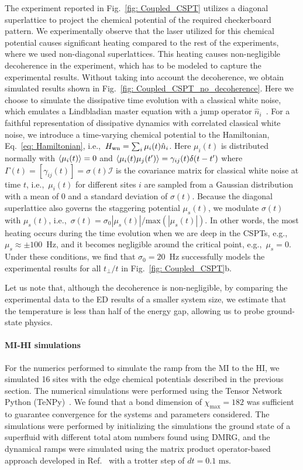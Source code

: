 \documentclass[preprint,superscriptaddress,floatfix, nofootinbib]{revtex4-2}
\begin{document}
The experiment reported in Fig.~\ref{fig: Coupled_CSPT} utilizes a diagonal superlattice to project the chemical potential of the required checkerboard pattern. We experimentally observe that the laser utilized for this chemical potential causes significant heating compared to the rest of the experiments, where we used non-diagonal superlattices. This heating causes non-negligible decoherence in the experiment, which has to be modeled to capture the experimental results. Without taking into account the decoherence, we obtain simulated results shown in Fig.~\ref{fig: Coupled_CSPT_no_decoherence}. Here we choose to simulate the dissipative time evolution with a classical white noise, which emulates a Lindbladian master equation with a jump operator $\hat n_i$~\cite{Kampen1992, Seif2022}. For a faithful representation of dissipative dynamics with correlated classical white noise, we introduce a time-varying chemical potential to the Hamiltonian, Eq.~\eqref{eq: Hamiltonian}, i.e.,~$H_{\rm wn}=\sum_i \mu_i(t) \hat  n_i$. Here $\mu_i(t)$ is distributed normally with $\braket{\mu_i(t)}=0$ and $\braket{\mu_i(t)\mu_j(t')}=\gamma_{ij}(t) \delta(t-t')$ where $\Gamma(t)=\left[\gamma_{ij}(t)\right]=\sigma(t)\mathcal{I}$ is the covariance matrix for classical white noise at time $t$, i.e.,~$\mu_i(t)$ for different sites $i$ are sampled from a Gaussian distribution with a mean of $0$ and a standard deviation of $\sigma(t)$. Because the diagonal superlattice also governs the staggering potential $\mu_s(t)$, we modulate $\sigma(t)$ with $\mu_s(t)$, i.e.,~$\sigma(t)=\sigma_0 |\mu_s(t)|/\textrm{max}(|\mu_s(t)|)$. In other words, the most heating occurs during the time evolution when we are deep in the CSPTs, e.g.,~$\mu_s \approx \pm 100$~Hz, and it becomes negligible around the critical point, e.g.,~$\mu_s=0$. Under these conditions, we find that $\sigma_0=20$~Hz successfully models the experimental results for all $t_\perp/t$ in Fig.~\ref{fig: Coupled_CSPT}b.

Let us note that, although the decoherence is non-negligible, by comparing the experimental data to the ED results of a smaller system size, we estimate that the temperature is less than half of the energy gap, allowing us to probe ground-state physics.

\paragraph*{MI-HI simulations} For the numerics performed to simulate the ramp from the MI to the HI, we simulated 16 sites with the edge chemical potentials described in the previous section.
%
The numerical simulations were performed using the Tensor Network Python (TeNPy)~\cite{Hauschild18}. 
%
We found that a bond dimension of $\chi_{\text{max}} = 182$ was sufficient to guarantee convergence for the systems and parameters considered.
%
The simulations were performed by initializing the simulations the ground state of a superfluid with different total atom numbers found using DMRG, and the dynamical ramps were simulated using the matrix product operator-based approach developed
in Ref.~\cite{Zaletel2015} with a trotter step of $dt = 0.1 \text{ ms}$.
\end{document}
